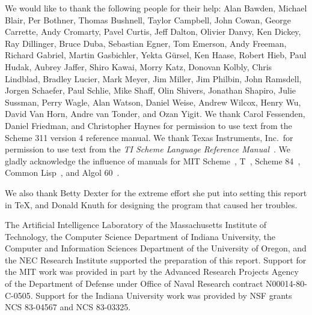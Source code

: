 We would like to thank the following people for their help: Alan Bawden, Michael
Blair, Per Bothner, Thomas Bushnell, Taylor Campbell, John Cowan, George Carrette, Andy Cromarty, Pavel Curtis, Jeff Dalton, Olivier Danvy,
Ken Dickey, Ray Dillinger, Bruce Duba, 
Sebastian Egner, Tom Emerson,
Andy Freeman, Richard Gabriel, Martin Gasbichler, Yekta G\"ursel, Ken Haase, Robert
Hieb, Paul Hudak, Aubrey Jaffer, Shiro Kawai, Morry Katz, Donovan Kolbly, Chris Lindblad, Bradley
Lucier, Mark Meyer, Jim Miller, Jim Philbin,
John Ramsdell, Jorgen Schaefer, Paul Schlie, Mike Shaff, Olin Shivers, Jonathan Shapiro, Julie Sussman,
Perry Wagle, Alan Watson, Daniel Weise, Andrew Wilcox, Henry Wu, David Van Horn, Andre van Tonder,
and Ozan Yigit.
We thank Carol Fessenden, Daniel
Friedman, and Christopher Haynes for permission to use text from the Scheme 311
version 4 reference manual.  We thank Texas Instruments, Inc.~for permission to
use text from the {\em TI Scheme Language Reference Manual}~\cite{TImanual85}.
We gladly acknowledge the influence of manuals for MIT Scheme~\cite{MITScheme},
T~\cite{Rees84}, Scheme 84~\cite{Scheme84}, Common Lisp~\cite{CLtL},
and Algol 60~\cite{Naur63}.

\vest We also thank Betty Dexter for the extreme effort she put into
setting this report in \TeX, and Donald Knuth for designing the program
that caused her troubles.

\vest The Artificial Intelligence Laboratory of the
Massachusetts Institute of Technology, the Computer Science
Department of Indiana University, the Computer and Information
Sciences Department of the University of Oregon, and the NEC Research
Institute supported the preparation of this report.  Support for the MIT
work was provided in part by
the Advanced Research Projects Agency of the Department of Defense under Office
of Naval Research contract N00014-80-C-0505.  Support for the Indiana
University work was provided by NSF grants NCS 83-04567 and NCS
83-03325.


